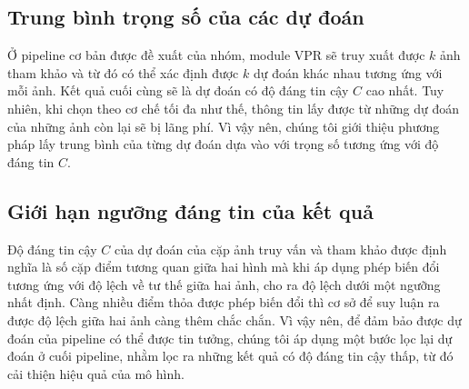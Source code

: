 \subsection{Trung bình trọng số của các dự đoán}

Ở pipeline cơ bản được đề xuất của nhóm, module VPR sẽ truy xuất được $k$ ảnh tham khảo và từ đó có thể xác định được $k$ dự đoán khác nhau tương ứng với mỗi ảnh. Kết quả cuối cùng sẽ là dự đoán có độ đáng tin cậy $C$ cao nhất. Tuy nhiên, khi chọn theo cơ chế tối đa như thế, thông tin lấy được từ những dự đoán của những ảnh còn lại sẽ bị lãng phí. Vì vậy nên, chúng tôi giới thiệu phương pháp lấy trung bình của từng dự đoán dựa vào với trọng số tương ứng với độ đáng tin $C$.

\subsection{Giới hạn ngưỡng đáng tin của kết quả}

Độ đáng tin cậy $C$ của dự đoán của cặp ảnh truy vấn và tham khảo được định nghĩa là số cặp điểm tương quan giữa hai hình mà khi áp dụng phép biến đổi tương ứng với độ lệch về tư thế giữa hai ảnh, cho ra độ lệch dưới một ngưỡng nhất định. Càng nhiều điểm thỏa được phép biến đổi thì cơ sở để suy luận ra được độ lệch giữa hai ảnh càng thêm chắc chắn. Vì vậy nên, để đảm bảo được dự đoán của pipeline có thể được tin tưởng, chúng tôi áp dụng một bước lọc lại dự đoán ở cuối pipeline, nhằm lọc ra những kết quả có độ đáng tin cậy thấp, từ đó cải thiện hiệu quả của mô hình.

